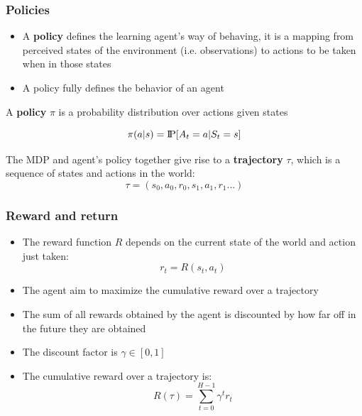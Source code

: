 \documentclass[9pt]{beamer}
\newcommand{\Pprob}{\text{I\kern-0.15em P}}
\begin{document}


\begin{frame}
	
	\frametitle{Policies}
\begin{itemize}
	\item A \textbf{policy} defines the learning agent's way of behaving, it is a mapping from perceived states of the environment (i.e. observations) to actions to be taken when in those states
	\item A policy fully defines the behavior of an agent
\end{itemize}

\begin{definition}
	 A \textbf{policy} $\pi$ is a probability distribution over actions given states
	
	\begin{equation}
	\pi(a | s) = \Pprob[A_t=a|S_t=s]
	\end{equation}

\end{definition}

The MDP and agent's policy together give rise to a \textbf{trajectory} $\tau$, which is a sequence of states and actions in the world:
$$\tau = (s_0, a_0, r_0, s_1, a_1, r_1...)$$

\end{frame}




\begin{frame}

	\frametitle{Reward and return}
	\begin{itemize}
		\item The reward function $R$ depends on the current state of the world and action just taken:
		$$r_t = R(s_t, a_t)$$
		\item The agent aim to maximize the cumulative reward over a trajectory
		\item The sum of all rewards obtained by the agent is discounted by how far off in the future they are obtained
		\item The discount factor is $\gamma \in [0,1]$
		\item The cumulative reward over a trajectory is:		
			\begin{equation}
			R(\tau) = \sum_{t=0}^{H-1} \gamma^t r_t
			\end{equation}
	\end{itemize}
	
\end{frame}
\end{document}
